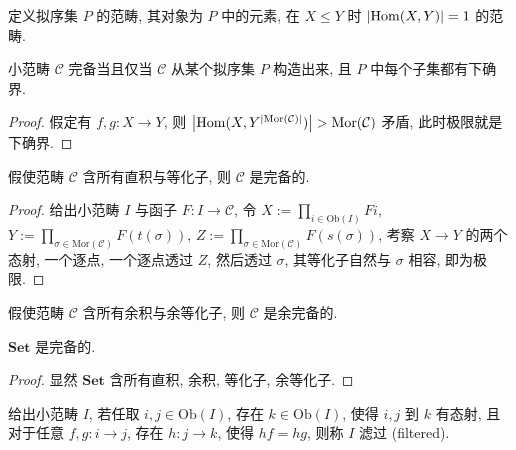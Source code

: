 \begin{definition}
    定义拟序集 \(P\) 的范畴, 其对象为 \(P\) 中的元素, 在 \(X \leq Y\) 时 \(\abs{\mathrm{Hom} (X,Y)} = 1\) 的范畴.
\end{definition}

\begin{lemma}[Freyd]
    小范畴 \(\mathcal{C}\) 完备当且仅当 \(\mathcal{C}\) 从某个拟序集 \(P\) 构造出来, 且 \(P\) 中每个子集都有下确界.

    \begin{proof}
        假定有 \(f,g : X \to Y\), 则 \(\abs{\mathrm{Hom} (X,Y^{\abs{\mathrm{Mor} (\mathcal{C})}})} > \mathrm{Mor} (\mathcal{C})\)
        矛盾, 此时极限就是下确界.
    \end{proof}
\end{lemma}

\begin{theorem}
    假使范畴 \(\mathcal{C}\) 含所有直积与等化子, 则 \(\mathcal{C}\) 是完备的.

    \begin{proof}
        给出小范畴 \(I\) 与函子 \(F : I \to \mathcal{C}\), 令 \(X := \prod_{i \in \mathrm{Ob} (I)} F i\),
        \(Y := \prod_{\sigma \in \mathrm{Mor} (\mathcal{C})} F (t (\sigma))\), \(Z := \prod_{\sigma \in \mathrm{Mor} (\mathcal{C})} F (s (\sigma))\),
        考察 \(X \to Y\) 的两个态射, 一个逐点, 一个逐点透过 \(Z\), 然后透过 \(\sigma\), 其等化子自然与 \(\sigma\) 相容, 即为极限.
    \end{proof}
\end{theorem}

\begin{corollary}
    假使范畴 \(\mathcal{C}\) 含所有余积与余等化子, 则 \(\mathcal{C}\) 是余完备的.
\end{corollary}

\begin{lemma}
    \(\mathbf{Set}\) 是完备的.

    \begin{proof}
        显然 \(\mathbf{Set}\) 含所有直积, 余积, 等化子, 余等化子.
    \end{proof}
\end{lemma}

\begin{definition}[滤过]
    \label {definition:filtered category}
    给出小范畴 \(I\), 若任取 \(i,j \in \mathrm{Ob} (I)\), 存在 \(k \in \mathrm{Ob} (I)\), 使得 \(i,j\) 到 \(k\) 有态射,
    且对于任意 \(f,g : i \to j\), 存在 \(h : j \to k\), 使得 \(h f = h g\), 则称 \(I\) 滤过 (filtered).
\end{definition}

